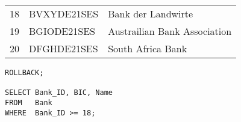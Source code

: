           \begin{center}
            \begin{small}
              \tablehead{}
              \begin{msoraclesql}
                \begin{supertabular}{rll}
                  18 & BVXYDE21SES & Bank der Landwirte \\
                  19 & BGIODE21SES & Austrailian Bank Association \\
                  20 & DFGHDE21SES & South Africa Bank \\
                \end{supertabular}
              \end{msoraclesql}
            \end{small}
          \end{center}
          \begin{lstlisting}[language=oracle_sql,label=sql07_30]
ROLLBACK;

SELECT Bank_ID, BIC, Name
FROM   Bank
WHERE  Bank_ID >= 18;
          \end{lstlisting}
